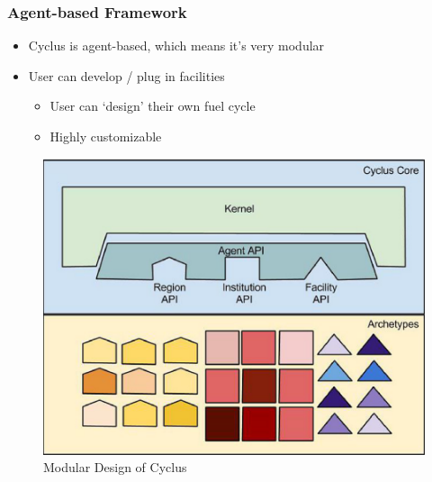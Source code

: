 \begin{frame}
	\frametitle{Agent-based Framework}
	\begin{itemize}
		\item Cyclus is agent-based, which means it's very modular
		\item User can develop / plug in facilities
			\begin{itemize}
				\item User can `design' their own fuel cycle
				\item Highly customizable
			\end{itemize}
	\end{itemize}
	\begin{figure}[htbp!]
        \begin{center}
                \includegraphics[width=.6\textwidth]{./images/cyclus_structure.png}
        \end{center}
        \caption{Modular Design of Cyclus}
        \label{fig:cyclus_struc}

	\end{figure}
\end{frame}


